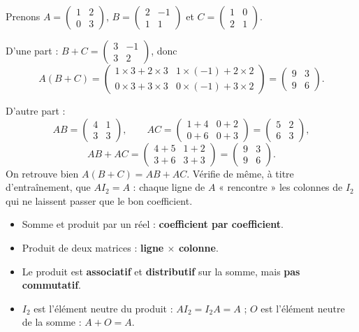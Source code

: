 \documentclass[11pt]{article}
\begin{document}
\begin{exemplebox}
Prenons $A = \begin{pmatrix} 1 & 2 \\ 0 & 3 \end{pmatrix}$, $B = \begin{pmatrix} 2 & -1 \\ 1 & 1 \end{pmatrix}$ et $C = \begin{pmatrix} 1 & 0 \\ 2 & 1 \end{pmatrix}$.

D'une part : $B + C = \begin{pmatrix} 3 & -1 \\ 3 & 2 \end{pmatrix}$, donc
\[ A(B+C) = \begin{pmatrix} 1\times 3 + 2\times 3 & 1\times(-1) + 2\times 2 \\ 0\times 3 + 3\times 3 & 0\times(-1) + 3\times 2 \end{pmatrix} = \begin{pmatrix} 9 & 3 \\ 9 & 6 \end{pmatrix}. \]

D'autre part :
\[ AB = \begin{pmatrix} 4 & 1 \\ 3 & 3 \end{pmatrix}, \qquad AC = \begin{pmatrix} 1+4 & 0+2 \\ 0+6 & 0+3 \end{pmatrix} = \begin{pmatrix} 5 & 2 \\ 6 & 3 \end{pmatrix}, \]
\[ AB + AC = \begin{pmatrix} 4+5 & 1+2 \\ 3+6 & 3+3 \end{pmatrix} = \begin{pmatrix} 9 & 3 \\ 9 & 6 \end{pmatrix}. \]
On retrouve bien $A(B+C) = AB + AC$. Vérifie de même, à titre d'entraînement, que $AI_2 = A$ : chaque ligne de $A$ « rencontre » les colonnes de $I_2$ qui ne laissent passer que le bon coefficient.
\end{exemplebox}

\begin{aretenir}
\begin{itemize}
\item Somme et produit par un réel : \textbf{coefficient par coefficient}.
\item Produit de deux matrices : \textbf{ligne $\times$ colonne}.
\item Le produit est \textbf{associatif} et \textbf{distributif} sur la somme, mais \textbf{pas commutatif}.
\item $I_2$ est l'élément neutre du produit : $AI_2 = I_2A = A$ ; $O$ est l'élément neutre de la somme : $A + O = A$.
\end{itemize}
\end{aretenir}
\end{document}
